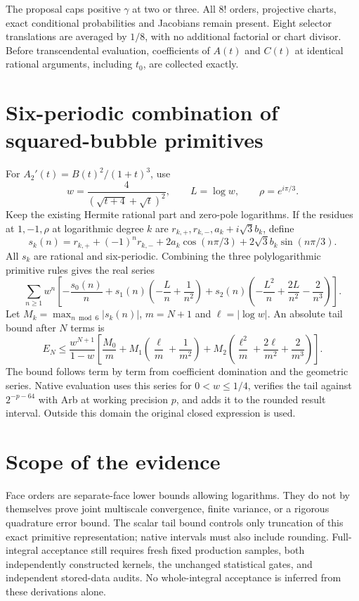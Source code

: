 \documentclass[11pt]{article}
\begin{document}
The proposal caps positive $\gamma$ at two or three. All $8!$ orders, projective charts, exact conditional probabilities and Jacobians remain present. Eight selector translations are averaged by $1/8$, with no additional factorial or chart divisor. Before transcendental evaluation, coefficients of $A(t)$ and $C(t)$ at identical rational arguments, including $t_0$, are collected exactly.
\section{Six-periodic combination of squared-bubble primitives}
For $A_2'(t)=B(t)^2/(1+t)^3$, use
\[
 w=\frac4{(\sqrt{t+4}+\sqrt t)^2},\qquad L=\log w,\qquad \rho=e^{i\pi/3}.
\]
Keep the existing Hermite rational part and zero-pole logarithms. If the residues at $1,-1,\rho$ at logarithmic degree $k$ are $r_{k,+},r_{k,-},a_k+i\sqrt3 b_k$, define
\[
 s_k(n)=r_{k,+}+(-1)^n r_{k,-}+2a_k\cos(n\pi/3)+2\sqrt3 b_k\sin(n\pi/3).
\]
All $s_k$ are rational and six-periodic. Combining the three polylogarithmic primitive rules gives the real series
\[
 \sum_{n\geq1}w^n\left[-\frac{s_0(n)}n+s_1(n)\left(-\frac Ln+\frac1{n^2}\right)+s_2(n)\left(-\frac{L^2}n+\frac{2L}{n^2}-\frac2{n^3}\right)\right].
\]
Let $M_k=\max_{n\bmod6}|s_k(n)|$, $m=N+1$ and $\ell=|\log w|$. An absolute tail bound after $N$ terms is
\[
 E_N\leq\frac{w^{N+1}}{1-w}\left[\frac{M_0}{m}+M_1\left(\frac\ell m+\frac1{m^2}\right)+M_2\left(\frac{\ell^2}m+\frac{2\ell}{m^2}+\frac2{m^3}\right)\right].
\]
The bound follows term by term from coefficient domination and the geometric series. Native evaluation uses this series for $0<w\leq1/4$, verifies the tail against $2^{-p-64}$ with Arb at working precision $p$, and adds it to the rounded result interval. Outside this domain the original closed expression is used.
\section{Scope of the evidence}
Face orders are separate-face lower bounds allowing logarithms. They do not by themselves prove joint multiscale convergence, finite variance, or a rigorous quadrature error bound. The scalar tail bound controls only truncation of this exact primitive representation; native intervals must also include rounding. Full-integral acceptance still requires fresh fixed production samples, both independently constructed kernels, the unchanged statistical gates, and independent stored-data audits. No whole-integral acceptance is inferred from these derivations alone.
\end{document}
